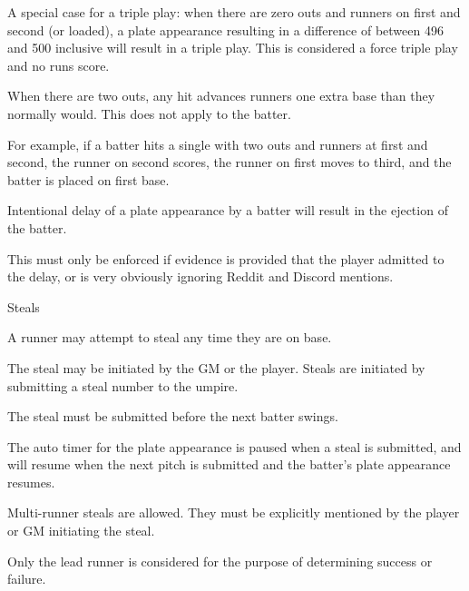 \begin{deepEnumerate}
\begin{deepEnumerate}
\begin{center}
		\end{center}
		\item A special case for a triple play: when there are zero outs and runners on first and second (or loaded), 
		a plate appearance resulting in a difference of between 496 and 500 inclusive will result in a triple play. 
		This is considered a force triple play and no runs score.
		\item When there are two outs, any hit advances runners one extra base than they normally would. 
		This does not apply to the batter.
		\begin{deepEnumerate}
			\item For example, if a batter hits a single with two outs and runners at first and second, 
			the runner on second scores, the runner on first moves to third, and the batter is placed on first base.
		\end{deepEnumerate}
		\item Intentional delay of a plate appearance by a batter will result in the ejection of the batter.
		\begin{deepEnumerate}
			\item This must only be enforced if evidence is provided that the player admitted to the delay, 
			or is very obviously ignoring Reddit and Discord mentions.
		\end{deepEnumerate}
	\end{deepEnumerate}
	\item Steals
	\begin{deepEnumerate}
		\item A runner may attempt to steal any time they are on base.
		\begin{deepEnumerate}
			\item The steal may be initiated by the GM or the player. Steals are initiated by submitting a steal number to the umpire.
			\item The steal must be submitted before the next batter swings.
			\begin{deepEnumerate}
				\item The auto timer for the plate appearance is paused when a steal is submitted, 
				and will resume when the next pitch is submitted and the batter’s plate appearance resumes.
			\end{deepEnumerate}
			\item Multi-runner steals are allowed. They must be explicitly mentioned by the player or GM initiating the steal.
			\begin{deepEnumerate}
				\item Only the lead runner is considered for the purpose of determining success or failure. 

\end{deepEnumerate}
\end{deepEnumerate}
\end{deepEnumerate}
\end{deepEnumerate}
